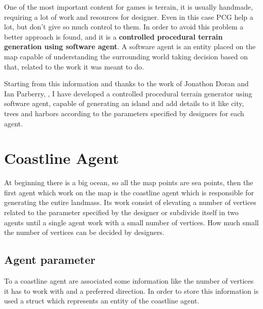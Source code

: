 \documentclass[12pt]{article}
\begin{document}
    One of the most important content for games is terrain, it is usually handmade, requiring a lot of work and resources for designer. Even in this case PCG help
    a lot, but don't give so much control to them. In order to avoid this problem a better approach is found, and it is a \textbf{controlled procedural terrain generation
    using software agent}. A software agent is an entity placed on the map capable of understanding the surrounding world taking decision based on that, related to
    the work it was meant to do.

    Starting from this information and thanks to the work of Jonathon Doran and Ian Parberry, \cite{article}, I have developed a controlled procedural terrain generator using software 
    agent, capable of generating an island and add details to it like city, trees and harbors according to the parameters specified by designers for each agent.

    \newpage

    \section{Coastline Agent}
    At beginning there is a big ocean, so all the map points are sea points, then the first agent which work on the map is the coastline agent which is responsible for 
    generating the entire landmass. Its work consist of elevating a number of vertices related to the parameter specified by the designer or subdivide itself in two agents
    until a single agent work with a small number of vertices. How much small the number of vertices can be decided by designers.

    \subsection{Agent parameter}
    To a coastline agent are associated some information like the number of vertices it has to work with and a preferred direction. In order to store this information is used
    a struct which represents an entity of the coastline agent. 
\end{document}
